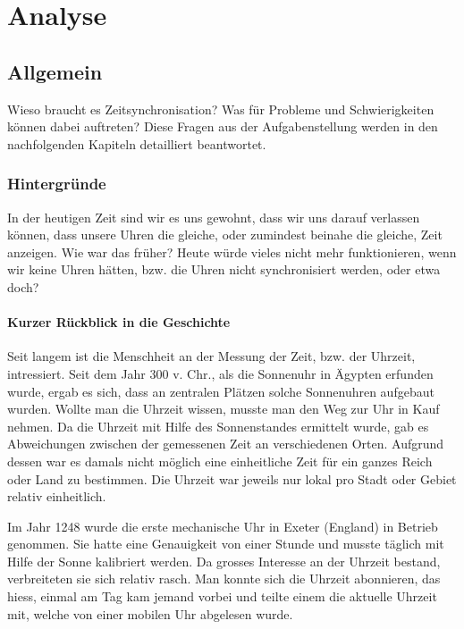
\chapter{Analyse}



\section{Allgemein}
Wieso braucht es Zeitsynchronisation? Was für Probleme und Schwierigkeiten können dabei auftreten? Diese Fragen aus der Aufgabenstellung werden in den nachfolgenden Kapiteln detailliert beantwortet.

\subsection{Hintergründe} \label{subsec:Analyse:Hintergruende}
In der heutigen Zeit sind wir es uns gewohnt, dass wir uns darauf verlassen können, dass unsere Uhren die gleiche, oder zumindest beinahe die gleiche, Zeit anzeigen. 
Wie war das früher? Heute würde vieles nicht mehr funktionieren, wenn wir keine Uhren hätten, bzw. die Uhren nicht synchronisiert werden, oder etwa doch?

\subsubsection{Kurzer Rückblick in die Geschichte} \label{subsubsec:Analyse:BlickGeschichte}
Seit langem ist die Menschheit an der Messung der Zeit, bzw. der Uhrzeit, intressiert.
Seit dem Jahr 300 v. Chr., als die Sonnenuhr in Ägypten erfunden wurde, ergab es sich, dass an zentralen Plätzen solche Sonnenuhren aufgebaut wurden. Wollte man die Uhrzeit wissen, musste man den Weg zur Uhr in Kauf nehmen.
Da die Uhrzeit mit Hilfe des Sonnenstandes ermittelt wurde, gab es Abweichungen zwischen der gemessenen Zeit an verschiedenen Orten. Aufgrund dessen war es damals nicht möglich eine einheitliche Zeit für ein ganzes Reich oder Land zu bestimmen. Die Uhrzeit war jeweils nur lokal pro Stadt oder Gebiet relativ einheitlich.

Im Jahr 1248 wurde die erste mechanische Uhr in Exeter (England) in Betrieb genommen. Sie hatte eine Genauigkeit von einer Stunde und musste täglich mit Hilfe der Sonne kalibriert werden.
Da grosses Interesse an der Uhrzeit bestand, verbreiteten sie sich relativ rasch.
Man konnte sich die Uhrzeit abonnieren, das hiess, einmal am Tag kam jemand vorbei und teilte einem die aktuelle Uhrzeit mit, welche von einer mobilen Uhr abgelesen wurde.

